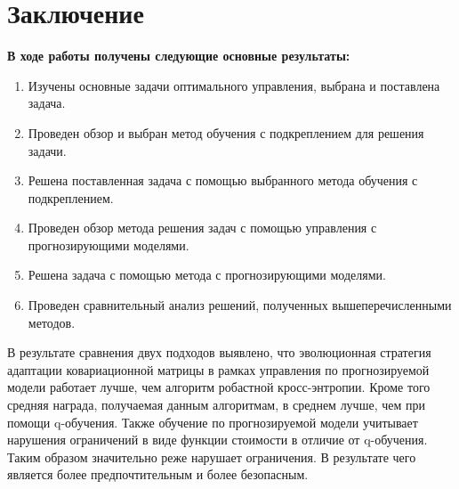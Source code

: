 \chapter*{Заключение}


\textbf{В ходе работы получены следующие основные результаты:}


\begin{enumerate}
	\item Изучены основные задачи оптимального управления, выбрана и поставлена задача.
	\item Проведен обзор и выбран метод обучения с подкреплением для решения задачи.
	\item Решена поставленная задача с помощью выбранного метода обучения с подкреплением.
	\item Проведен обзор метода решения задач с помощью управления с прогнозирующими моделями.
	\item Решена задача с помощью метода с прогнозирующими моделями.
	\item Проведен сравнительный анализ решений, полученных вышеперечисленными методов. 
\end{enumerate}

В результате сравнения двух подходов выявлено, что эволюционная стратегия адаптации ковариационной матрицы в рамках управления по прогнозируемой модели работает лучше, чем алгоритм робастной кросс-энтропии. Кроме того средняя награда, получаемая данным алгоритмам, в среднем лучше, чем при помощи q-обучения. Также обучение по прогнозируемой модели учитывает  нарушения ограничений в виде функции стоимости в отличие от q-обучения. Таким образом значительно реже нарушает ограничения. В результате чего является более  предпочтительным и более безопасным.
